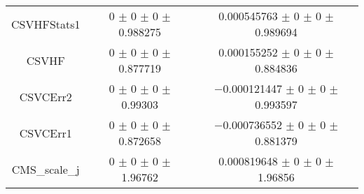 \begin{table}
\begin{tabular}{ccc}
CSVHFStats1 	& \num{0} $\pm$ \num{0} $\pm$ \num{0} $\pm$ \num{0.988275} 	& \num{0.000545763} $\pm$ \num{0} $\pm$ \num{0} $\pm$ \num{0.989694}\\
CSVHF 	& \num{0} $\pm$ \num{0} $\pm$ \num{0} $\pm$ \num{0.877719} 	& \num{0.000155252} $\pm$ \num{0} $\pm$ \num{0} $\pm$ \num{0.884836}\\
CSVCErr2 	& \num{0} $\pm$ \num{0} $\pm$ \num{0} $\pm$ \num{0.99303} 	& \num{-0.000121447} $\pm$ \num{0} $\pm$ \num{0} $\pm$ \num{0.993597}\\
CSVCErr1 	& \num{0} $\pm$ \num{0} $\pm$ \num{0} $\pm$ \num{0.872658} 	& \num{-0.000736552} $\pm$ \num{0} $\pm$ \num{0} $\pm$ \num{0.881379}\\
CMS\_scale\_j 	& \num{0} $\pm$ \num{0} $\pm$ \num{0} $\pm$ \num{1.96762} 	& \num{0.000819648} $\pm$ \num{0} $\pm$ \num{0} $\pm$ \num{1.96856}\\
\bottomrule
\end{tabular}
\end{table}